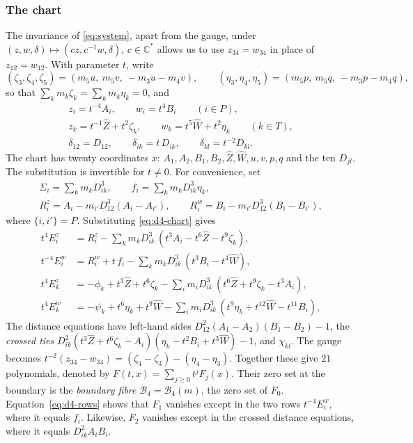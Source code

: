 \documentclass[11pt]{amsart}
\theoremstyle{definition}
\theoremstyle{remark}
\newcommand{\C}{\mathbb{C}}
\begin{document}
\subsubsection{The chart}\label{d4-chart}
{The invariance of \eqref{eq:system}, apart from the gauge, under
$(z,w,\delta)\mapsto(cz,c^{-1}w,\delta)$, $c\in\C^*$ allows us to use
$z_{34}=w_{34}$ in place of $z_{12}=w_{12}$. With parameter $t$, write}
\[
  (\zeta_3,\zeta_4,\zeta_5)=(m_5u,\ m_5v,\ -m_3u-m_4v),\qquad
  (\eta_3,\eta_4,\eta_5)=(m_5p,\ m_5q,\ -m_3p-m_4q),
\]
so that $\sum_km_k\zeta_k=\sum_km_k\eta_k=0$, and
\begin{equation}\label{eq:d4-chart}
\begin{gathered}
  z_i=t^{-4}A_i,\qquad w_i=t^{4}B_i\qquad(i\in P),\\
  z_k=t^{-1}\hat Z+t^{2}\zeta_k,\qquad w_k=t^{5}\hat W+t^{2}\eta_k\qquad(k\in T),\\
  \delta_{12}=D_{12},\qquad\delta_{ik}=t\,D_{ik},\qquad\delta_{kl}=t^{-2}D_{kl}.
\end{gathered}
\end{equation}
{The chart has twenty coordinates $x$: $A_1,A_2,B_1,B_2,\hat Z,\hat W,u,v,p,q$
and the ten $D_{jl}$. The substitution is invertible for $t\ne0$.
For convenience, set}
\[
\begin{gathered}
  \Sigma_i=\sum_km_kD_{ik}^3,\qquad f_i=\sum_km_kD_{ik}^3\eta_k,\\
  R^z_i=A_i-m_{i'}D_{12}^3(A_i-A_{i'}),\qquad R^w_i=B_i-m_{i'}D_{12}^3(B_i-B_{i'}),
\end{gathered}
\]
where $\{i,i'\}=P$.  Substituting \eqref{eq:d4-chart} gives
\begin{equation}\label{eq:d4-rows}
\begin{aligned}
  t^{4}E^z_i&=R^z_i-\textstyle\sum_km_kD_{ik}^3\,(t^3A_i-t^6\hat Z-t^9\zeta_k),\\
  t^{-4}E^w_i&=R^w_i+t\,f_i-\textstyle\sum_km_kD_{ik}^3\,(t^3B_i-t^4\hat W),\\
  t^{4}E^z_k&=-\phi_k+t^3\hat Z+t^6\zeta_k-\textstyle\sum_im_iD_{ik}^3\,(t^6\hat Z+t^9\zeta_k-t^3A_i),\\
  t^{4}E^w_k&=-\psi_k+t^6\eta_k+t^9\hat W-\textstyle\sum_im_iD_{ik}^3\,(t^9\eta_k+t^{12}\hat W
  -t^{11}B_i),
\end{aligned}
\end{equation}
{The distance equations have left-hand sides
$D_{12}^2(A_1-A_2)(B_1-B_2)-1$, the \emph{crossed ties}
$D_{ik}^2(t^3\hat Z+t^6\zeta_k-A_i)(\eta_k-t^2B_i+t^3\hat W)-1$, and $\chi_{kl}$.
The gauge becomes $t^{-2}(z_{34}-w_{34})=(\zeta_4-\zeta_3)-(\eta_4-\eta_3)$.
Together these give $21$ polynomials, denoted by $F(t,x)=\sum_{j\ge0}t^jF_j(x)$.
Their zero set at the boundary is the \emph{boundary fibre} $\mathcal B_4=\mathcal B_4(m)$,
the zero set of $F_0$. Equation~\eqref{eq:d4-rows} shows that $F_1$ vanishes except in the two
rows $t^{-4}E^w_i$, where it equals $f_i$. Likewise, $F_2$ vanishes except in the crossed
distance equations, where it equals $D_{ik}^2A_iB_i$.}
\end{document}
